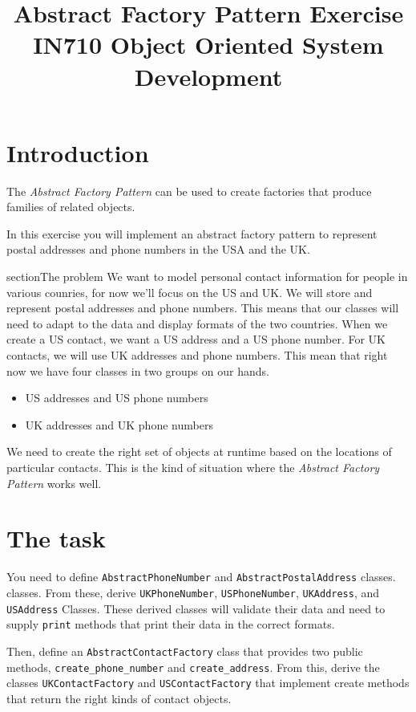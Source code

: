 \documentclass{article}
\begin{document}
\title{Abstract Factory Pattern Exercise\\IN710 Object Oriented System Development}
\date{}
\maketitle

\section*{Introduction}
The \emph{Abstract Factory Pattern} can be used to create factories 
that produce families of related objects.

In this exercise you will implement an abstract factory pattern 
to represent postal addresses and phone numbers in the USA and the
UK.

section{The problem}
We want to model personal contact information for people in various counries,
for now we'll focus on the US and UK.  We will store and represent postal addresses
and phone numbers.  This means that our classes will need to adapt to the 
data and display formats of the two countries.  When we create a US contact, 
we want a US address and a US phone number.  For UK contacts, we will use UK 
addresses and phone numbers.  This mean that right now we have four classes 
in two groups on our hands.

\begin{itemize}
	\item US addresses and US phone numbers
	\item UK addresses and UK phone numbers
\end{itemize}

We need to create the right set of objects at runtime based on the 
locations of particular contacts.  This is the kind of situation
where the \emph{Abstract Factory Pattern} works well.

\section{The task}
You need to define \texttt{AbstractPhoneNumber} and 
\texttt{AbstractPostalAddress} classes.  classes.  From these, derive 
\texttt{UKPhoneNumber}, \texttt{USPhoneNumber}, \texttt{UKAddress},
and \texttt{USAddress} Classes.  These derived classes will validate
their data and need to supply \texttt{print} methods that print their
data in the correct formats.

Then, define an \texttt{AbstractContactFactory} class that provides
two public methods, \texttt{create\_phone\_number} and 
\texttt{create\_address}.  From this, derive the classes 
\texttt{UKContactFactory} and \texttt{USContactFactory} that implement
create methods that return the right kinds of contact objects.
\end{document}
